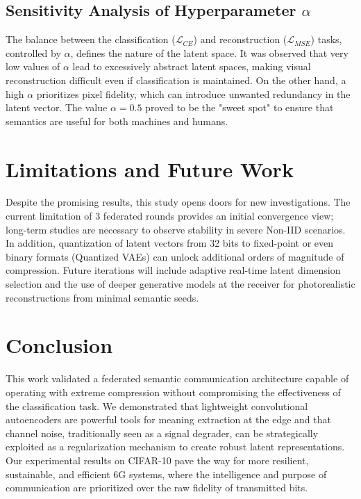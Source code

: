 \documentclass[conference,twocolumn]{IEEEtran}
\begin{document}
\subsection{Sensitivity Analysis of Hyperparameter $\alpha$}
The balance between the classification ($\mathcal{L}_{CE}$) and reconstruction ($\mathcal{L}_{MSE}$) tasks, controlled by $\alpha$, defines the nature of the latent space. It was observed that very low values of $\alpha$ lead to excessively abstract latent spaces, making visual reconstruction difficult even if classification is maintained. On the other hand, a high $\alpha$ prioritizes pixel fidelity, which can introduce unwanted redundancy in the latent vector. The value $\alpha=0.5$ proved to be the "sweet spot" to ensure that semantics are useful for both machines and humans.

\section{Limitations and Future Work}

Despite the promising results, this study opens doors for new investigations. The current limitation of 3 federated rounds provides an initial convergence view; long-term studies are necessary to observe stability in severe Non-IID scenarios. In addition, quantization of latent vectors from 32 bits to fixed-point or even binary formats (Quantized VAEs) can unlock additional orders of magnitude of compression. Future iterations will include adaptive real-time latent dimension selection and the use of deeper generative models at the receiver for photorealistic reconstructions from minimal semantic seeds.

\section{Conclusion}

This work validated a federated semantic communication architecture capable of operating with extreme compression without compromising the effectiveness of the classification task. We demonstrated that lightweight convolutional autoencoders are powerful tools for meaning extraction at the edge and that channel noise, traditionally seen as a signal degrader, can be strategically exploited as a regularization mechanism to create robust latent representations. Our experimental results on CIFAR-10 pave the way for more resilient, sustainable, and efficient 6G systems, where the intelligence and purpose of communication are prioritized over the raw fidelity of transmitted bits.



\end{document}
